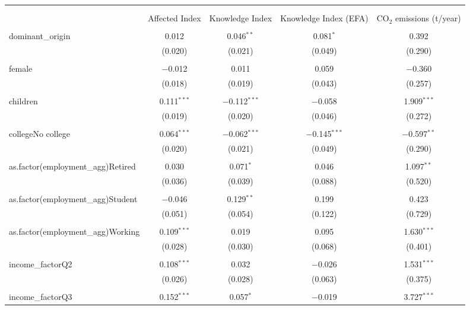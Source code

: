 
\begin{tabular}{@{\extracolsep{5pt}}lcccc} 
\\[-1.8ex]\hline 
\hline \\[-1.8ex] 
\\[-1.8ex] & Affected Index & Knowledge Index & Knowledge Index (EFA) & CO$_{2}$ emissions (t/year) \\ 
\hline \\[-1.8ex] 
 dominant\_origin & 0.012 & 0.046$^{**}$ & 0.081$^{*}$ & 0.392 \\ 
  & (0.020) & (0.021) & (0.049) & (0.290) \\ 
  & & & & \\ 
 female & $-$0.012 & 0.011 & 0.059 & $-$0.360 \\ 
  & (0.018) & (0.019) & (0.043) & (0.257) \\ 
  & & & & \\ 
 children & 0.111$^{***}$ & $-$0.112$^{***}$ & $-$0.058 & 1.909$^{***}$ \\ 
  & (0.019) & (0.020) & (0.046) & (0.272) \\ 
  & & & & \\ 
 collegeNo college & 0.064$^{***}$ & $-$0.062$^{***}$ & $-$0.145$^{***}$ & $-$0.597$^{**}$ \\ 
  & (0.020) & (0.021) & (0.049) & (0.290) \\ 
  & & & & \\ 
 as.factor(employment\_agg)Retired & 0.030 & 0.071$^{*}$ & 0.046 & 1.097$^{**}$ \\ 
  & (0.036) & (0.039) & (0.088) & (0.520) \\ 
  & & & & \\ 
 as.factor(employment\_agg)Student & $-$0.046 & 0.129$^{**}$ & 0.199 & 0.423 \\ 
  & (0.051) & (0.054) & (0.122) & (0.729) \\ 
  & & & & \\ 
 as.factor(employment\_agg)Working & 0.109$^{***}$ & 0.019 & 0.095 & 1.630$^{***}$ \\ 
  & (0.028) & (0.030) & (0.068) & (0.401) \\ 
  & & & & \\ 
 income\_factorQ2 & 0.108$^{***}$ & 0.032 & $-$0.026 & 1.531$^{***}$ \\ 
  & (0.026) & (0.028) & (0.063) & (0.375) \\ 
  & & & & \\ 
 income\_factorQ3 & 0.152$^{***}$ & 0.057$^{*}$ & $-$0.019 & 3.727$^{***}$ \\ 

\end{tabular}
